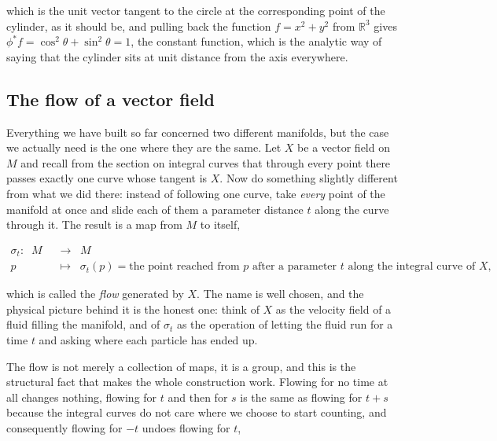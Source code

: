         which is the unit vector tangent to the circle at the corresponding point of the cylinder, as it should be, and pulling back the function $f = x^2+y^2$ from $\mathbb{R}^3$ gives $\phi^{*}f = \cos^2\theta + \sin^2\theta = 1$, the constant function, which is the analytic way of saying that the cylinder sits at unit distance from the axis everywhere.

    \subsection{The flow of a vector field}

        Everything we have built so far concerned two different manifolds, but the case we actually need is the one where they are the same. Let $X$ be a vector field on $M$ and recall from the section on integral curves that through every point there passes exactly one curve whose tangent is $X$. Now do something slightly different from what we did there: instead of following one curve, take \textit{every} point of the manifold at once and slide each of them a parameter distance $t$ along the curve through it. The result is a map from $M$ to itself,

        \begin{equation}\label{eq:FlowDef}
            \begin{split}
                \sigma_t: \;\; M \;\; &\rightarrow \;\; M\\
                p \;\; &\mapsto \;\; \sigma_t(p) = \text{the point reached from } p \text{ after a parameter } t \text{ along the integral curve of } X,
            \end{split}
        \end{equation}

        which is called the \textit{flow} generated by $X$. The name is well chosen, and the physical picture behind it is the honest one: think of $X$ as the velocity field of a fluid filling the manifold, and of $\sigma_t$ as the operation of letting the fluid run for a time $t$ and asking where each particle has ended up.

        The flow is not merely a collection of maps, it is a group, and this is the structural fact that makes the whole construction work. Flowing for no time at all changes nothing, flowing for $t$ and then for $s$ is the same as flowing for $t+s$ because the integral curves do not care where we choose to start counting, and consequently flowing for $-t$ undoes flowing for $t$,

